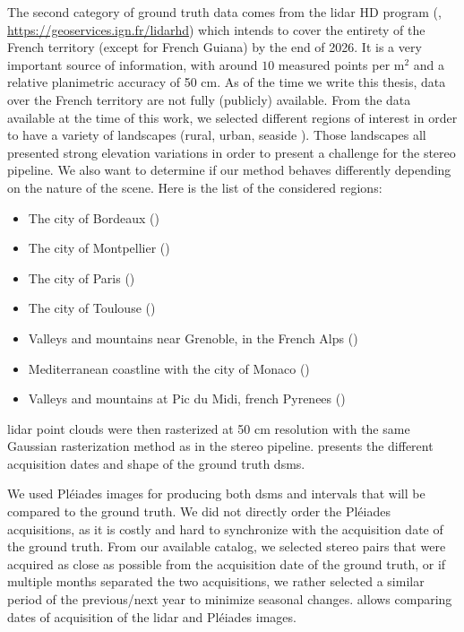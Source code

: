 The second category of ground truth data comes from the \acrshort{lidar} HD program (\cite{monnet_lidarhd_2023}, \url{https://geoservices.ign.fr/lidarhd}) which intends to cover the entirety of the French territory (except for French Guiana) by the end of 2026. It is a very important source of information, with around $10$ measured points per m$^2$ and a relative planimetric accuracy of 50 cm. As of the time we write this thesis, data over the French territory are not fully (publicly) available. From the data available at the time of this work, we selected different regions of interest in order to have a variety of landscapes (rural, urban, seaside \etc). Those landscapes all presented strong elevation variations in order to present a challenge for the stereo pipeline. We also want to determine if our method behaves differently depending on the nature of the scene. Here is the list of the considered regions:
\begin{itemize}
    \item The city of Bordeaux ()
    \item The city of Montpellier ()
    \item The city of Paris ()
    \item The city of Toulouse ()
    \item Valleys and mountains near Grenoble, in the French Alps ()
    \item Mediterranean coastline with the city of Monaco ()
    \item Valleys and mountains at Pic du Midi, french Pyrenees ()
\end{itemize}
\acrshort{lidar} point clouds were then rasterized at 50 cm resolution with the same Gaussian rasterization method as in the stereo pipeline.  presents the different acquisition dates and shape of the ground truth \acrshort{dsm}s.

We used Pléiades images for producing both \acrshort{dsm}s and intervals that will be compared to the ground truth. We did not directly order the Pléiades acquisitions, as it is costly and hard to synchronize with the acquisition date of the ground truth. From our available catalog, we selected stereo pairs that were acquired as close as possible from the acquisition date of the ground truth, or if multiple months separated the two acquisitions, we rather selected a similar period of the previous/next year to minimize seasonal changes.  allows comparing dates of acquisition of the \acrshort{lidar} and Pléiades images.

